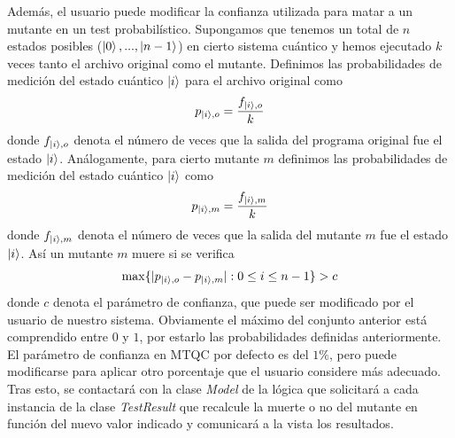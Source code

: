 Además, el usuario puede modificar la confianza utilizada para matar a un mutante en un test probabilístico. Supongamos que tenemos un total de $n$ estados posibles ($\left|0\right\rangle,...,\left|n-1\right\rangle$) en cierto sistema cuántico y hemos ejecutado $k$ veces tanto el archivo original como el mutante. Definimos las probabilidades de medición del estado cuántico $\left|i\right\rangle$ para el archivo original como
$$p_{\left|i\right\rangle,o}=\dfrac{f_{\left|i\right\rangle,o}}{k}
$$
donde $f_{\left|i\right\rangle,o}$ denota el número de veces que la salida del programa original fue el estado $\left|i\right\rangle$. Análogamente, para cierto  mutante $m$ definimos las probabilidades de medición del estado cuántico $\left|i\right\rangle$ como
$$
p_{\left|i\right\rangle,m}=\dfrac{f_{\left|i\right\rangle,m}}{k}
$$
donde $f_{\left|i\right\rangle,m}$ denota el número de veces que la salida del mutante $m$ fue el estado $\left|i\right\rangle$. Así un mutante $m$ muere si se verifica
$$
\max \{|p_{\left|i\right\rangle,o}-p_{\left|i\right\rangle,m}|:0\leq i\leq n - 1\}> c
$$
donde $c$ denota el parámetro de confianza, que puede ser modificado por el usuario de nuestro sistema. Obviamente el máximo del conjunto anterior está comprendido entre $0$ y $1$, por estarlo las probabilidades definidas anteriormente. El parámetro de confianza en MTQC por defecto es del $1\%$, pero puede modificarse para aplicar otro porcentaje que el usuario considere más adecuado. Tras esto, se contactará con la clase \textit{Model} de la lógica que solicitará a cada instancia de la clase \textit{TestResult} que recalcule la muerte o no del mutante en función del nuevo valor indicado y comunicará a la vista los resultados.